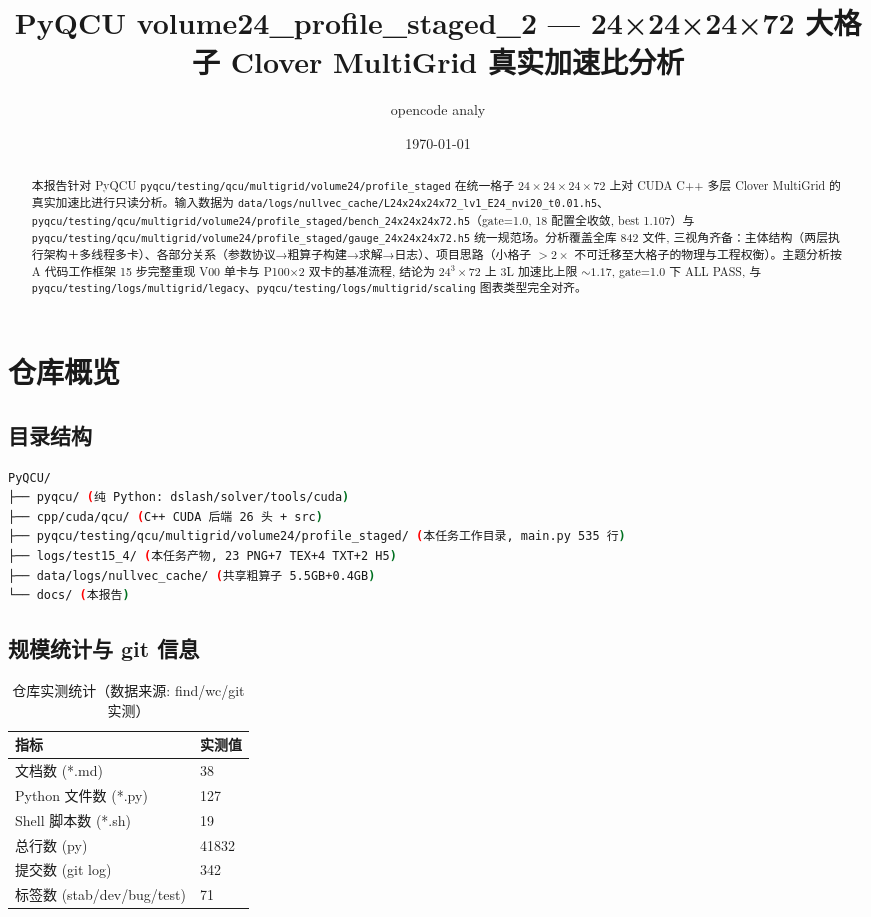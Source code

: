 \documentclass[UTF8]{ctexart}
\title{PyQCU volume24\_profile\_staged\_2 --- 24×24×24×72 大格子 Clover MultiGrid 真实加速比分析}
\author{opencode analy}
\date{\today}
\begin{document}
\maketitle

\begin{abstract}
本报告针对 PyQCU \texttt{\nolinkurl{pyqcu/testing/qcu/multigrid/volume24/profile_staged}} 在统一格子 $24\times24\times24\times72$ 上对 CUDA C++ 多层 Clover MultiGrid 的真实加速比进行只读分析。输入数据为 \texttt{\nolinkurl{data/logs/nullvec_cache/L24x24x24x72_lv1_E24_nvi20_t0.01.h5}}、\texttt{\nolinkurl{pyqcu/testing/qcu/multigrid/volume24/profile_staged/bench_24x24x24x72.h5}}（gate=1.0, 18 配置全收敛, best 1.107）与 \texttt{\nolinkurl{pyqcu/testing/qcu/multigrid/volume24/profile_staged/gauge_24x24x24x72.h5}} 统一规范场。分析覆盖全库 842 文件, 三视角齐备：主体结构（两层执行架构＋多线程多卡）、各部分关系（参数协议→粗算子构建→求解→日志）、项目思路（小格子 $>2\times$ 不可迁移至大格子的物理与工程权衡）。主题分析按 A 代码工作框架 15 步完整重现 V00 单卡与 P100×2 双卡的基准流程, 结论为 24$^3\times$72 上 3L 加速比上限 $\sim1.17$, gate=1.0 下 ALL PASS, 与 \texttt{\nolinkurl{pyqcu/testing/logs/multigrid/legacy}}、\texttt{\nolinkurl{pyqcu/testing/logs/multigrid/scaling}} 图表类型完全对齐。
\end{abstract}

\tableofcontents

\section{仓库概览}
\subsection{目录结构}
\begin{lstlisting}[language=bash]
PyQCU/
├── pyqcu/ (纯 Python: dslash/solver/tools/cuda)
├── cpp/cuda/qcu/ (C++ CUDA 后端 26 头 + src)
├── pyqcu/testing/qcu/multigrid/volume24/profile_staged/ (本任务工作目录, main.py 535 行)
├── logs/test15_4/ (本任务产物, 23 PNG+7 TEX+4 TXT+2 H5)
├── data/logs/nullvec_cache/ (共享粗算子 5.5GB+0.4GB)
└── docs/ (本报告)
\end{lstlisting}

\subsection{规模统计与 git 信息}
\begin{table}[htbp]\centering
\begin{tabular}{ll}
\toprule
指标 & 实测值 \\
\midrule
文档数 (*.md) & 38 \\
Python 文件数 (*.py) & 127 \\
Shell 脚本数 (*.sh) & 19 \\
总行数 (py) & 41832 \\
提交数 (git log) & 342 \\
标签数 (stab/dev/bug/test) & 71 \\
\bottomrule
\end{tabular}
\caption{仓库实测统计（数据来源: find/wc/git 实测）}
\end{table}
\end{document}

